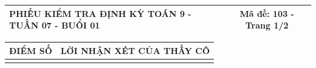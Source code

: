 \documentclass[12pt,a4paper]{article}
\begin{document}
\newpage

\noindent
\begin{tabularx}{\linewidth}{|X|c|}
\hline
\textbf{PHIẾU KIỂM TRA ĐỊNH KỲ TOÁN 9 - TUẦN 07 - BUỔI 01} & \textbf{Mã đề: 103 - Trang 1/2} \\
\hline
\end{tabularx}

\vspace{1.0mm}

\noindent
\begin{tabularx}{\linewidth}{|p{3.2cm}|X|}
\hline
\centering\textbf{ĐIỂM SỐ} & \centering\textbf{LỜI NHẬN XÉT CỦA THẦY CÔ} \tabularnewline
\hline
\rule{0pt}{1.8cm} & \tabularnewline
\hline
\end{tabularx}
\end{document}
